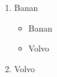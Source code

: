 \documentclass{article}
\begin{document}
\begin{enumerate}
\item	Banan
	\begin{itemize}
	\item	Banan
	\item	Volvo
	\end{itemize}
\item	Volvo
\end{enumerate}
\end{document}
